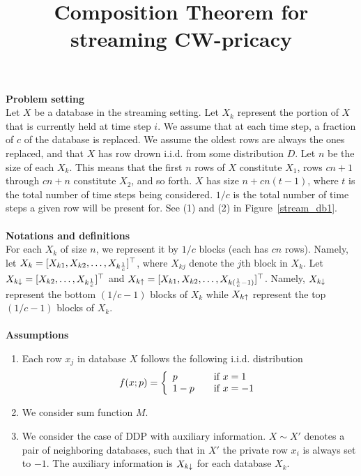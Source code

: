 \documentclass[11pt]{article}
\title{Composition Theorem for streaming CW-pricacy}
\date{}
\begin{document}
\maketitle

{\bf Problem setting} \\
Let $X$ be a database in the streaming setting. Let $X_{k}$ represent the portion of $X$ that is currently held at time step $i$. We assume that at each time step, a fraction of $c$ of the database is replaced. We assume the oldest rows are always the ones replaced, and that $X$ has row drown i.i.d. from some distribution $D$. Let $n$ be the size of each $X_{k}$. This means that the first $n$ rows of $X$ constitute $X_{1}$, rows $cn+1$ through $cn+n$ constitute $X_{2}$, and so forth. $X$ has size $n+cn(t-1)$, where $t$ is the total number of time steps being considered. $1/c$ is the total number of time steps a given row will be present for. See (1) and (2) in Figure~\ref{stream_db1}. 
\\
\\
{\bf Notations and definitions}\\
For each $X_k$ of size $n$, we represent it by $1/c$ blocks (each has $cn$ rows). Namely, let $X_{k}=[X_{k 1}, X_{k 2} , \dots, X_{k \frac{1}{c}}]^{\top}$, where $X_{kj}$ denote the $j$th block in $X_{k}$. Let $X_{k \downarrow} = [X_{k 2} , \dots, X_{k \frac{1}{c}}]^{\top}$ and $X_{k \uparrow} = [X_{k 1}, X_{k2} , \dots, X_{k (\frac{1}{c}-1)}]^{\top}$. Namely, $X_{k \downarrow}$ represent the bottom $(1/c -1)$ blocks of $X_{k}$ while $X_{k \uparrow}$ represent the top $(1/c-1)$ blocks of $X_{k}$.
\\
\\
{\bf Assumptions }\\
\begin{enumerate}
\item Each row $x_{j}$ in database $X$ follows the following i.i.d. distribution
\[ f(x; p) = \left\{ 
  \begin{array}{l l}
    p & \quad \text{if $x=1$}\\
    1-p & \quad \text{if $x=-1$}
  \end{array} \right.\]
 \item We consider sum function $M$.
 \item We consider the case of DDP with auxiliary information. $X \sim X'$ denotes a pair of neighboring databases, such that in $X'$ the private row $x_{i}$ is always set to $-1$. The auxiliary information is $X_{k \downarrow}$ for each database $X_{k}$.
\end{enumerate}
\end{document}
